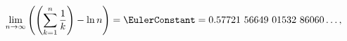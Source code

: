 \[\lim_{n\to\infty}\left(\left(\sum^{n}_{k=1}\frac{1}{k}\right)-\mathop{\ln\/}%
\nolimits n\right)=\EulerConstant=0.57721\ 56649\ 01532\ 86060\dots,\]